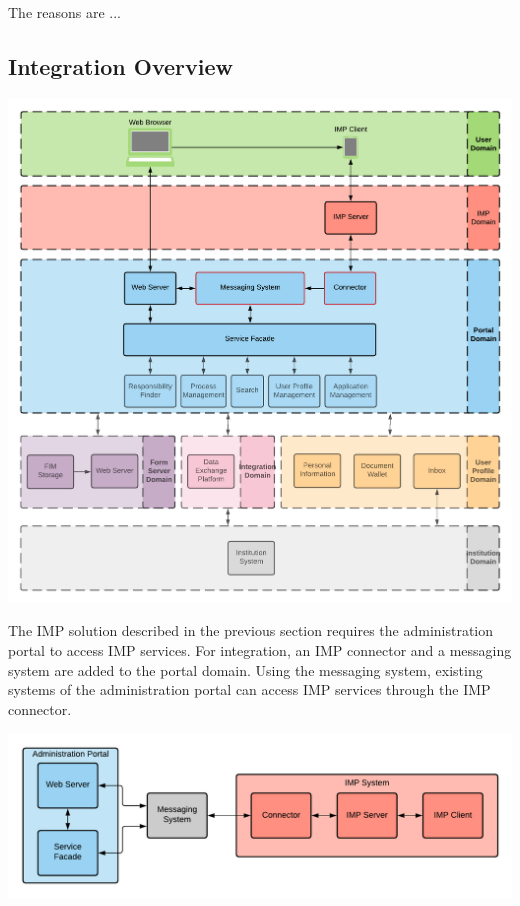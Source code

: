 The reasons are ...

\subsection{Integration Overview}

\begin{center}
    \includegraphics[scale=0.6]{Diagrams/Integration Architecture 1/Technological Integration/1. Integration Overview.pdf}
\end{center}

The IMP solution described in the previous section requires the administration portal to access IMP services. For integration, an IMP connector and a messaging system are added to the portal domain. Using the messaging system, existing systems of the administration portal can access IMP services through the IMP connector.

\begin{center}
    \includegraphics[scale=0.6]{Diagrams/Integration Architecture 1/Technological Integration/2. System Integration Overview.pdf}
\end{center}

